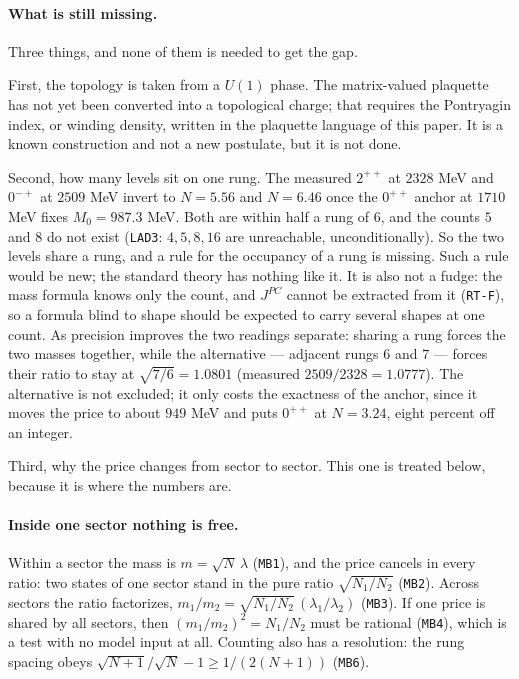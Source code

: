 \documentclass[aps,prd,preprint,superscriptaddress,amsmath,amssymb]{revtex4-2}
\begin{document}
\paragraph{What is still missing.}
Three things, and none of them is needed to get the gap.

First, the topology is taken from a $U(1)$ phase.  The matrix-valued plaquette
has not yet been converted into a topological charge; that requires the
Pontryagin index, or winding density, written in the plaquette language of
this paper.  It is a known construction and not a new postulate, but it is not
done.

Second, how many levels sit on one rung.  The measured $2^{++}$ at $2328$ MeV
and $0^{-+}$ at $2509$ MeV invert to $N=5.56$ and $N=6.46$ once the $0^{++}$
anchor at $1710$ MeV fixes $M_0=987.3$ MeV.  Both are within half a rung of
$6$, and the counts $5$ and $8$ do not exist (\texttt{LAD3}: $4,5,8,16$ are
unreachable, unconditionally).  So the two levels share a rung, and a rule for
the occupancy of a rung is missing.  Such a rule would be new; the standard
theory has nothing like it.  It is also not a fudge: the mass formula knows
only the count, and $J^{PC}$ cannot be extracted from it (\texttt{RT-F}), so a
formula blind to shape should be expected to carry several shapes at one
count.  As precision improves the two readings separate: sharing a rung forces
the two masses together, while the alternative --- adjacent rungs $6$ and $7$
--- forces their ratio to stay at $\sqrt{7/6}=1.0801$ (measured
$2509/2328=1.0777$).  The alternative is not excluded; it only costs the
exactness of the anchor, since it moves the price to about $949$ MeV and puts
$0^{++}$ at $N=3.24$, eight percent off an integer.

Third, why the price changes from sector to sector.  This one is treated
below, because it is where the numbers are.

\paragraph{Inside one sector nothing is free.}
Within a sector the mass is $m=\sqrt N\,\lambda$ (\texttt{MB1}), and the price
cancels in every ratio: two states of one sector stand in the pure ratio
$\sqrt{N_1/N_2}$ (\texttt{MB2}).  Across sectors the ratio factorizes,
$m_1/m_2=\sqrt{N_1/N_2}\,(\lambda_1/\lambda_2)$ (\texttt{MB3}).  If one price
is shared by all sectors, then $(m_1/m_2)^2=N_1/N_2$ must be rational
(\texttt{MB4}), which is a test with no model input at all.  Counting also has
a resolution: the rung spacing obeys
$\sqrt{N+1}/\sqrt{N}-1\ge 1/(2(N+1))$ (\texttt{MB6}).
\end{document}
